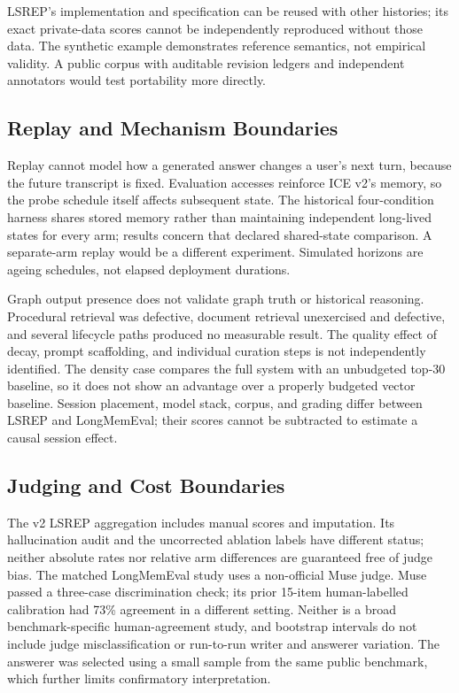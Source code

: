 \documentclass[11pt,a4paper]{article}
\begin{document}
LSREP's implementation and specification can be reused with other histories; its exact private-data scores cannot be independently reproduced without those data. The synthetic example demonstrates reference semantics, not empirical validity. A public corpus with auditable revision ledgers and independent annotators would test portability more directly.

\subsection{Replay and Mechanism Boundaries}
Replay cannot model how a generated answer changes a user's next turn, because the future transcript is fixed. Evaluation accesses reinforce ICE v2's memory, so the probe schedule itself affects subsequent state. The historical four-condition harness shares stored memory rather than maintaining independent long-lived states for every arm; results concern that declared shared-state comparison. A separate-arm replay would be a different experiment. Simulated horizons are ageing schedules, not elapsed deployment durations.

Graph output presence does not validate graph truth or historical reasoning. Procedural retrieval was defective, document retrieval unexercised and defective, and several lifecycle paths produced no measurable result. The quality effect of decay, prompt scaffolding, and individual curation steps is not independently identified. The density case compares the full system with an unbudgeted top-30 baseline, so it does not show an advantage over a properly budgeted vector baseline. Session placement, model stack, corpus, and grading differ between LSREP and LongMemEval; their scores cannot be subtracted to estimate a causal session effect.

\subsection{Judging and Cost Boundaries}
The v2 LSREP aggregation includes manual scores and imputation. Its hallucination audit and the uncorrected ablation labels have different status; neither absolute rates nor relative arm differences are guaranteed free of judge bias. The matched LongMemEval study uses a non-official Muse judge. Muse passed a three-case discrimination check; its prior 15-item human-labelled calibration had 73\% agreement in a different setting. Neither is a broad benchmark-specific human-agreement study, and bootstrap intervals do not include judge misclassification or run-to-run writer and answerer variation. The answerer was selected using a small sample from the same public benchmark, which further limits confirmatory interpretation.
\end{document}
